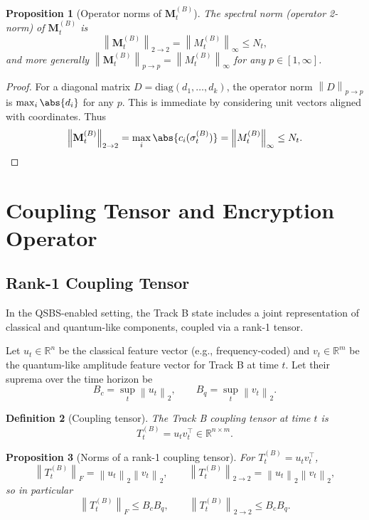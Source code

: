 \documentclass[11pt]{article}
\newtheorem{definition}{Definition}[section]
\newtheorem{proposition}[definition]{Proposition}
\newcommand{\R}{\mathbb{R}}
\newcommand{\norm}[1]{\left\lVert #1 \right\rVert}
\begin{document}
\begin{proposition}[Operator norms of \(\mathbf{M}_t^{(B)}\)]
The spectral norm (operator 2-norm) of \(\mathbf{M}_t^{(B)}\) is
\[
  \norm{\mathbf{M}_t^{(B)}}_{2\to2} = \norm{M_t^{(B)}}_\infty \le N_t,
\]
and more generally \(\norm{\mathbf{M}_t^{(B)}}_{p\to p} = \norm{M_t^{(B)}}_\infty\) for any \(p \in [1,\infty]\).
\end{proposition}

\begin{proof}
For a diagonal matrix \(D = \mathrm{diag}(d_1,\dots,d_k)\), the operator norm \(\norm{D}_{p\to p}\) is \(\max_i \abs{d_i}\) for any \(p\).
This is immediate by considering unit vectors aligned with coordinates.
Thus
\[
  \norm{\mathbf{M}_t^{(B)}}_{2\to2} = \max_i \abs{c_i(\sigma_t^{(B)})} = \norm{M_t^{(B)}}_\infty \le N_t.
\]
\end{proof}

\section{Coupling Tensor and Encryption Operator}

\subsection{Rank-1 Coupling Tensor}

In the QSBS-enabled setting, the Track B state includes a joint representation of classical and quantum-like components, coupled via a rank-1 tensor.

Let \(u_t \in \R^n\) be the classical feature vector (e.g., frequency-coded) and \(v_t \in \R^m\) be the quantum-like amplitude feature vector for Track B at time \(t\).
Let their suprema over the time horizon be
\[
  B_c = \sup_t \norm{u_t}_2, \qquad
  B_q = \sup_t \norm{v_t}_2.
\]

\begin{definition}[Coupling tensor]
The Track B coupling tensor at time \(t\) is
\[
  T_t^{(B)} = u_t v_t^\top \in \R^{n \times m}.
\]
\end{definition}

\begin{proposition}[Norms of a rank-1 coupling tensor]
For \(T_t^{(B)} = u_t v_t^\top\),
\[
  \norm{T_t^{(B)}}_F = \norm{u_t}_2 \norm{v_t}_2, \qquad
  \norm{T_t^{(B)}}_{2\to2} = \norm{u_t}_2 \norm{v_t}_2,
\]
so in particular
\[
  \norm{T_t^{(B)}}_F \le B_c B_q, \qquad
  \norm{T_t^{(B)}}_{2\to2} \le B_c B_q.
\]
\end{proposition}
\end{document}
